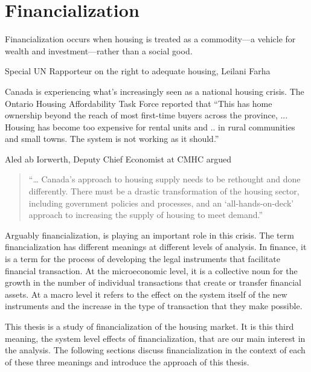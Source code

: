 \chapter{Financialization} \label{chapter-financialization}
\epigraph{Financialization  occurs when housing is treated as a commodity—a vehicle for wealth and investment—rather than a social good.}{Special UN Rapporteur on the right to adequate housing, Leilani Farha}


Canada is experiencing what's increasingly seen as a national housing crisis. The Ontario Housing Affordability Task Force reported that ``This has home ownership beyond the reach of most first-time buyers across the province, ... Housing has become too expensive for rental units and ..  in rural communities and small towns. The system is not working as it should.''

Aled ab Iorwerth, Deputy Chief Economist at CMHC argued
\begin{quotation}
     “… Canada’s approach to housing supply needs to be rethought and done differently. There must be a drastic transformation of the housing sector, including government policies and processes, and an ‘all-hands-on-deck’ approach to increasing the supply of housing to meet demand.”\cite{CanadaHousingSupply2022}
\end{quotation}

Arguably financialization, %
is playing an important role in this crisis. The term financialization has different meanings at different levels of analysis. In finance, it is a term for the process of developing the legal instruments that facilitate financial transaction. At the microeconomic level, it is a collective noun for the growth in the number of individual transactions that create or transfer financial assets. At a macro level it refers to the effect on the system itself of the new instruments and the increase in the type of transaction that they make possible.

This thesis is a study of financialization of the housing market. It is this third meaning, the system level effects of financialization, that are our main interest in the analysis. The following sections discuss financialization in the context of each of these three meanings and introduce the approach of this thesis. 

